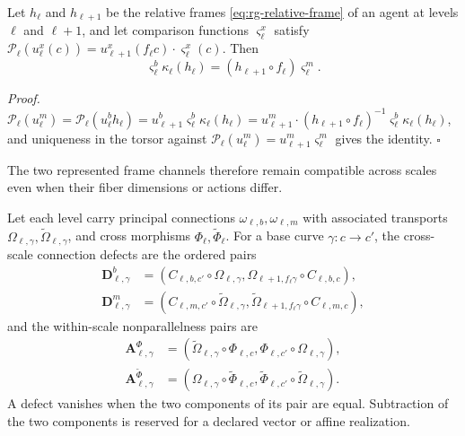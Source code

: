Let \(h_\ell\) and \(h_{\ell+1}\) be the relative frames \eqref{eq:rg-relative-frame} of an agent at
levels \(\ell\) and \(\ell+1\), and let comparison functions \(\varsigma_\ell^x\) satisfy
\(\mathcal P_\ell(u_\ell^x(c))=u_{\ell+1}^x(f_\ell c)\cdot\varsigma_\ell^x(c)\). Then
\begin{equation}
\varsigma_\ell^b\kappa_\ell(h_\ell)
=(h_{\ell+1}\circ f_\ell)\varsigma_\ell^m.
\label{eq:rg-relative-frame-naturality}
\end{equation}

\noindent\emph{Proof.}
\(\mathcal P_\ell(u_\ell^m)=\mathcal P_\ell(u_\ell^bh_\ell)=u_{\ell+1}^b\varsigma_\ell^b\kappa_\ell(h_\ell)
=u_{\ell+1}^m\cdot(h_{\ell+1}\circ f_\ell)^{-1}\varsigma_\ell^b\kappa_\ell(h_\ell)\), and uniqueness in
the torsor against \(\mathcal P_\ell(u_\ell^m)=u_{\ell+1}^m\varsigma_\ell^m\) gives the identity.
\hfill$\square$

The two represented frame channels therefore remain compatible across scales even when their fiber
dimensions or actions differ.

Let each level carry principal connections \(\omega_{\ell,b},\omega_{\ell,m}\) with associated
transports \(\Omega_{\ell,\gamma},\widetilde\Omega_{\ell,\gamma}\), and cross morphisms
\(\Phi_\ell,\widetilde\Phi_\ell\). For a base curve \(\gamma:c\to c'\), the cross-scale connection
defects are the ordered pairs
\begin{align}
\mathbf D^b_{\ell,\gamma}
&=\left(C_{\ell,b,c'}\circ\Omega_{\ell,\gamma},
\Omega_{\ell+1,f_\ell\gamma}\circ C_{\ell,b,c}\right),\nonumber\\
\mathbf D^m_{\ell,\gamma}
&=\left(C_{\ell,m,c'}\circ\widetilde\Omega_{\ell,\gamma},
\widetilde\Omega_{\ell+1,f_\ell\gamma}\circ C_{\ell,m,c}\right),
\label{eq:rg-cross-connection-defects}
\end{align}
and the within-scale nonparallelness pairs are
\begin{align}
\mathbf A^\Phi_{\ell,\gamma}
&=\left(\widetilde\Omega_{\ell,\gamma}\circ\Phi_{\ell,c},
\Phi_{\ell,c'}\circ\Omega_{\ell,\gamma}\right),\nonumber\\
\mathbf A^{\widetilde\Phi}_{\ell,\gamma}
&=\left(\Omega_{\ell,\gamma}\circ\widetilde\Phi_{\ell,c},
\widetilde\Phi_{\ell,c'}\circ\widetilde\Omega_{\ell,\gamma}\right).
\label{eq:rg-within-connection-defects}
\end{align}
A defect vanishes when the two components of its pair are equal. Subtraction of the two components
is reserved for a declared vector or affine realization.

